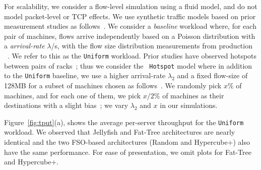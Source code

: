  For scalability, we consider 
   a flow-level simulation using a fluid model, and do not model 
 packet-level or TCP effects. 
 We use synthetic traffic models based on
prior measurement studies as follows~\cite{vl2,3db}.  We consider a
{\em baseline} workload where, for each pair of machines, flows arrive
independently based on a Poisson distribution with a {\em
  arrival-rate} $\lambda$/s, with the flow size distribution
measurements from production \DCs~\cite{vl2}.  We refer to
this as the {\tt Uniform} workload.  Prior studies have observed
hotspots between pairs of racks~\cite{vl2}; thus we consider the {\tt
  Hotspot} model where in addition to the {\tt Uniform} baseline, we
use a higher arrival-rate $\lambda_2$ and a fixed flow-size of 128MB
for a subset of machines chosen as follows~\cite{3db}. We randomly
pick $x$\% of machines, and for each one of them, we pick $x/2$\% of
machines as their destinations with a slight bias~\cite{3db}; we vary
$\lambda_2$ and $x$ in our simulations.  

  Figure~\ref{fig:tput}(a), shows the average
per-server throughput for the {\tt Uniform} workload.  We observed that
Jellyfish and Fat-Tree architectures are nearly identical  and the two
FSO-based architectures (Random and Hypercube+) also have the same performance.
For ease of presentation,  we omit  plots for Fat-Tree and Hypercube+.

